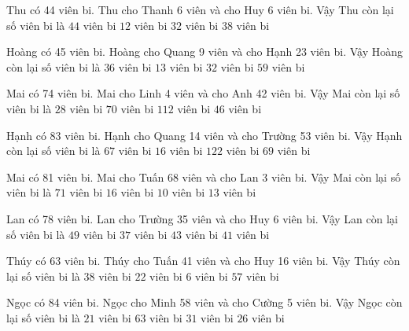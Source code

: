 \documentclass[12pt,a4paper]{article}
\begin{document}
\begin{ex}
Thu có 44 viên bi. Thu cho Thanh 6 viên và cho Huy 6 viên bi. Vậy Thu còn lại số viên bi là
 \choice 
{$44$ viên bi}
{$12$ viên bi}
{\True $32$ viên bi}
{$38$ viên bi}
\end{ex}
\begin{ex}
Hoàng có 45 viên bi. Hoàng cho Quang 9 viên và cho Hạnh 23 viên bi. Vậy Hoàng còn lại số viên bi là
 \choice 
{$36$ viên bi}
{\True $13$ viên bi}
{$32$ viên bi}
{$59$ viên bi}
\end{ex}
\begin{ex}
Mai có 74 viên bi. Mai cho Linh 4 viên và cho Anh 42 viên bi. Vậy Mai còn lại số viên bi là
 \choice 
{\True $28$ viên bi}
{$70$ viên bi}
{$112$ viên bi}
{$46$ viên bi}
\end{ex}
\begin{ex}
Hạnh có 83 viên bi. Hạnh cho Quang 14 viên và cho Trường 53 viên bi. Vậy Hạnh còn lại số viên bi là
 \choice 
{$67$ viên bi}
{\True $16$ viên bi}
{$122$ viên bi}
{$69$ viên bi}
\end{ex}
\begin{ex}
Mai có 81 viên bi. Mai cho Tuấn 68 viên và cho Lan 3 viên bi. Vậy Mai còn lại số viên bi là
 \choice 
{$71$ viên bi}
{$16$ viên bi}
{\True $10$ viên bi}
{$13$ viên bi}
\end{ex}
\begin{ex}
Lan có 78 viên bi. Lan cho Trường 35 viên và cho Huy 6 viên bi. Vậy Lan còn lại số viên bi là
 \choice 
{$49$ viên bi}
{\True $37$ viên bi}
{$43$ viên bi}
{$41$ viên bi}
\end{ex}
\begin{ex}
Thúy có 63 viên bi. Thúy cho Tuấn 41 viên và cho Huy 16 viên bi. Vậy Thúy còn lại số viên bi là
 \choice 
{$38$ viên bi}
{$22$ viên bi}
{\True $6$ viên bi}
{$57$ viên bi}
\end{ex}
\begin{ex}
Ngọc có 84 viên bi. Ngọc cho Minh 58 viên và cho Cường 5 viên bi. Vậy Ngọc còn lại số viên bi là
 \choice 
{\True $21$ viên bi}
{$63$ viên bi}
{$31$ viên bi}
{$26$ viên bi}
\end{ex}
\end{document}
